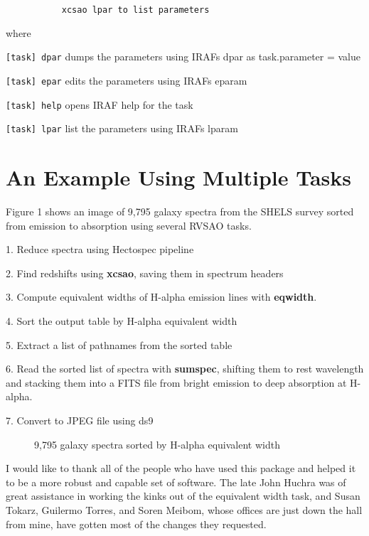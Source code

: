 \texttt{~~~~~~~~~~~xcsao lpar to list parameters}

where

\texttt{[task] dpar} dumps the parameters using IRAFs dpar as task.parameter = value

\texttt{[task] epar} edits the parameters using IRAFs eparam

\texttt{[task] help} opens IRAF help for the task

\texttt{[task] lpar} list the parameters using IRAFs lparam

\section{An Example Using Multiple Tasks}

Figure 1 shows an image of 9,795 galaxy spectra from the SHELS survey \citep{shels_2005} sorted from emission to absorption using several RVSAO tasks.

1.  Reduce spectra using Hectospec pipeline

2.  Find redshifts using \textbf{xcsao}, saving them in spectrum headers

3.  Compute equivalent widths of H-alpha emission lines with \textbf{eqwidth}.

4. Sort the output table by H-alpha equivalent width

5. Extract a list of pathnames from the sorted table

6. Read the sorted list of spectra with \textbf{sumspec}, shifting them to rest wavelength and stacking them into a FITS file from bright emission to deep absorption at H-alpha.

7. Convert to JPEG file using ds9

\begin{figure}[!ht]
\caption{9,795 galaxy spectra sorted by H-alpha equivalent width}
\end{figure}

\acknowledgements
I would like to thank all of the people who have used this package and helped it to be a more robust and capable set of software.  The late John Huchra was of great assistance in working the kinks out of the equivalent width task, and Susan Tokarz, Guilermo Torres, and Soren Meibom, whose offices are just down the hall from mine, have gotten most of the changes they requested.


